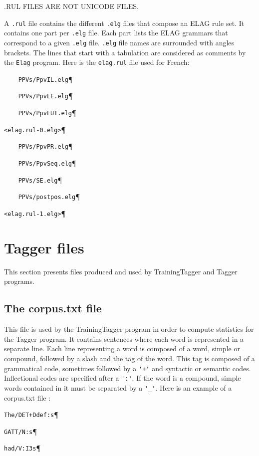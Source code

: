 .RUL FILES ARE NOT UNICODE FILES.

\bigskip
\noindent A \verb$.rul$ file contains the different \verb$.elg$ files that compose an ELAG
rule set. It contains one part per \verb$.elg$ file. Each part lists the ELAG
grammars that correspond to a given \verb$.elg$ file. \verb$.elg$ file names are
surrounded with angles brackets. The lines that start with a tabulation are
considered as comments by the \verb+Elag+
program. Here is the
\verb$elag.rul$ file used for French:

\bigskip
\verb$    PPVs/PpvIL.elg$\P

\verb$    PPVs/PpvLE.elg$\P

\verb$    PPVs/PpvLUI.elg$\P

\verb$<elag.rul-0.elg>$\P

\verb$    PPVs/PpvPR.elg$\P

\verb$    PPVs/PpvSeq.elg$\P

\verb$    PPVs/SE.elg$\P

\verb$    PPVs/postpos.elg$\P

\verb$<elag.rul-1.elg>$\P

\section{Tagger files}
This section presents files produced and used by TrainingTagger and Tagger programs.

\subsection{The corpus.txt file}
\label{section-corpus-file}
This file is used by the TrainingTagger program in order to compute statistics for the Tagger program. It contains sentences 
where each word is represented in a separate line. Each line representing a word is composed of a word, simple or compound, 
followed by a slash and the tag of the word. This tag is composed of a grammatical code, sometimes followed by a \verb$'+'$ and 
syntactic or semantic codes. Inflectional codes are specified after a \verb+':'+. If the word is a compound, simple words contained 
in it must be separated by a \verb+'_'+. 
Here is an example of a corpus.txt file :

\bigskip
\verb$The/DET+Ddef:s$\P

\verb+GATT/N:s+\P

\verb+had/V:I3s+\P

